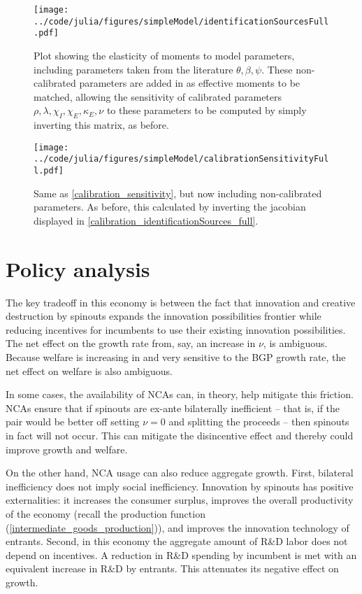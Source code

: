 \documentclass[11pt,english]{article}
\theoremstyle{remark}
\begin{document}
\begin{figure}[]
	\texttt{[image: ../code/julia/figures/simpleModel/identificationSourcesFull.pdf]}
	\caption{Plot showing the elasticity of moments to model parameters, including parameters taken from the literature $\theta , \beta, \psi$. These non-calibrated parameters are added in as effective moments to be matched, allowing the sensitivity of calibrated parameters $\rho, \lambda, \chi_I, \chi_E, \kappa_E, \nu$ to these parameters to be computed by simply inverting this matrix, as before.}
	\label{calibration_identificationSources_full}
\end{figure}

\begin{figure}[]
	\texttt{[image: ../code/julia/figures/simpleModel/calibrationSensitivityFull.pdf]}
	\caption{Same as \autoref{calibration_sensitivity}, but now including non-calibrated parameters. As before, this calculated by inverting the jacobian displayed in \autoref{calibration_identificationSources_full}.}
	\label{calibration_sensitivity_full}
\end{figure}

\section{Policy analysis}

The key tradeoff in this economy is between the fact that innovation and creative destruction by spinouts expands the innovation possibilities frontier while reducing incentives for incumbents to use their existing innovation possibilities. The net effect on the growth rate from, say, an increase in $\nu$, is ambiguous. Because welfare is increasing in and very sensitive to the BGP growth rate, the net effect on welfare is also ambiguous.

In some cases, the availability of NCAs can, in theory, help mitigate this friction. NCAs ensure that if spinouts are ex-ante bilaterally inefficient -- that is, if the pair would be better off setting $\nu = 0$ and splitting the proceeds -- then spinouts in fact will not occur. This can mitigate the disincentive effect and thereby could improve growth and welfare. 

On the other hand, NCA usage can also reduce aggregate growth. First, bilateral inefficiency does not imply social inefficiency. Innovation by spinouts has positive externalities: it increases the consumer surplus, improves the overall productivity of the economy (recall the production function (\ref{intermediate_goods_production})), and improves the innovation technology of entrants. Second, in this economy the aggregate amount of R\&D labor does not depend on incentives. A reduction in R\&D spending by incumbent is met with an equivalent increase in R\&D by entrants. This attenuates its negative effect on growth. 
\end{document}
